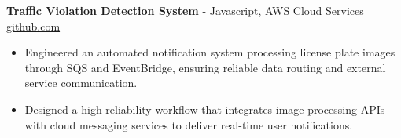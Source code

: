 \documentclass[11pt]{article}       %
\begin{document}

\textbf{Traffic Violation Detection System}{ - Javascript, AWS Cloud Services} \hfill \href{https://github.com/Monica20030707/AWS_rekonigition-N-read-database}{github.com} \\
\vspace{-9pt}
\begin{itemize}
  \item Engineered an automated notification system processing license plate images through SQS and EventBridge, ensuring reliable data routing and external service communication.
  \item Designed a high-reliability workflow that integrates image processing APIs with cloud messaging services to deliver real-time user notifications.
\end{itemize}

\end{document}

